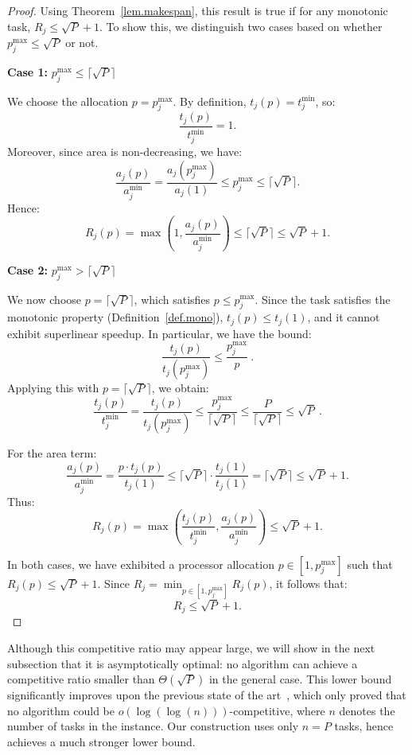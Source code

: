 \documentclass{article}
\newcommand\ratio{R\xspace}
\begin{document}
\begin{proof}
Using Theorem~\ref{lem.makespan}, this result is true if for any monotonic task, $R_j \leq \sqrt{P}+1$. To show this, we distinguish two cases based on whether \( p_j^{\max} \le \sqrt{P} \) or not.

\textbf{Case 1:} \( p_j^{\max} \le \lceil \sqrt{P} \rceil \)

We choose the allocation \( p = p_j^{\max} \). By definition, \( t_j(p) = t_j^{\min} \), so:
\[
\frac{t_j(p)}{t_j^{\min}} = 1.
\]
Moreover, since area is non-decreasing, we have:
\[
\frac{a_j(p)}{a_j^{\min}} = \frac{a_j(p_j^{\max})}{a_j(1)} \le p_j^{\max} \le \lceil \sqrt{P} \rceil.
\]
Hence:
\[
\ratio_j(p) = \max\left(1, \frac{a_j(p)}{a_j^{\min}}\right) \le \lceil \sqrt{P} \rceil \le \sqrt{P} + 1.
\]

\textbf{Case 2:} \( p_j^{\max} > \lceil \sqrt{P} \rceil \)

We now choose \( p = \lceil \sqrt{P} \rceil \), which satisfies \( p \le p_j^{\max} \). Since the task satisfies the monotonic property (Definition~\ref{def.mono}), $t_j(p) \leq t_j(1)$, and it cannot exhibit superlinear speedup. In particular, we have the bound:
\[
\frac{t_j(p)}{t_j(p_j^{\max})} \le \frac{p_j^{\max}}{p}\ .
\]
Applying this with \( p = \lceil \sqrt{P} \rceil \), we obtain:
\[
\frac{t_j(p)}{t_j^{\min}} = \frac{t_j(p)}{t_j(p_j^{\max})} \le \frac{p_j^{\max}}{\lceil \sqrt{P} \rceil} \le \frac{P}{\lceil \sqrt{P} \rceil} \le \sqrt{P}\ .
\]

For the area term:
\[
\frac{a_j(p)}{a_j^{\min}} = \frac{p \cdot t_j(p)}{t_j(1)} \le \lceil \sqrt{P} \rceil \cdot \frac{t_j(1)}{t_j(1)} = \lceil \sqrt{P} \rceil \le \sqrt{P} + 1.
\]
Thus:
\[
\ratio_j(p) = \max\left( \frac{t_j(p)}{t_j^{\min}}, \frac{a_j(p)}{a_j^{\min}} \right) \le \sqrt{P} + 1.
\]

In both cases, we have exhibited a processor allocation \( p \in [1, p_j^{\max}] \) such that \( \ratio_j(p) \le \sqrt{P} + 1 \). Since \(\ratio_j = \min_{p \in [1, p_j^{\max}]} \ratio_j(p)\), it follows that:
\[
\ratio_j \le \sqrt{P} + 1.
\]


\end{proof}

Although this competitive ratio may appear large, we will show in the next subsection that it is asymptotically optimal: no algorithm can achieve a competitive ratio smaller than $\Theta(\sqrt{P})$ in the general case. This lower bound significantly improves upon the previous state of the art~\cite{TOPC24}, which only proved that no algorithm could be $o(\log(\log(n)))$-competitive, where $n$ denotes the number of tasks in the instance. Our construction uses only $n = P$ tasks, hence achieves a much stronger lower bound.
\end{document}
